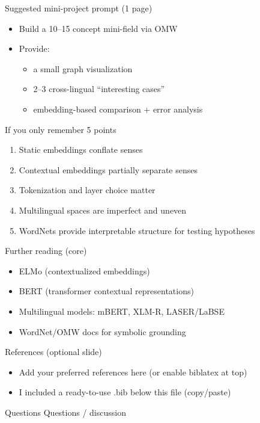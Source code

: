 \documentclass{beamer}
\begin{document}
\begin{frame}{Suggested mini-project prompt (1 page)}
\begin{itemize}
  \item Build a 10–15 concept mini-field via OMW
  \item Provide:
  \begin{itemize}
    \item a small graph visualization
    \item 2–3 cross-lingual ``interesting cases''
    \item embedding-based comparison + error analysis
  \end{itemize}
\end{itemize}
\end{frame}

\begin{frame}{If you only remember 5 points}
\begin{enumerate}
  \item Static embeddings conflate senses
  \item Contextual embeddings partially separate senses
  \item Tokenization and layer choice matter
  \item Multilingual spaces are imperfect and uneven
  \item WordNets provide interpretable structure for testing hypotheses
\end{enumerate}
\end{frame}

\begin{frame}{Further reading (core)}
\begin{itemize}
  \item ELMo (contextualized embeddings)
  \item BERT (transformer contextual representations)
  \item Multilingual models: mBERT, XLM-R, LASER/LaBSE
  \item WordNet/OMW docs for symbolic grounding
\end{itemize}
\end{frame}

\begin{frame}{References (optional slide)}
\begin{itemize}
  \item Add your preferred references here (or enable biblatex at top)
  \item I included a ready-to-use .bib below this file (copy/paste)
\end{itemize}
\end{frame}

\begin{frame}{Questions}
\centering
\Large Questions / discussion
\end{frame}

\end{document}
